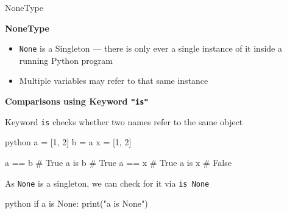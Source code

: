 \documentclass[
	11pt, 
]{beamer}
\begin{document}

\begin{frame}[fragile]{NoneType} %

\textbf{NoneType}
\begin{itemize}
    \item \texttt{None} is a Singleton --- there is only ever a single instance of it inside a running Python program
    \item Multiple variables may refer to that same instance
\end{itemize}

\vspace{.2cm}

\textbf{Comparisons using Keyword \texttt{"is"}}

\vspace{.2cm}

Keyword \texttt{is} checks whether two names refer to the same object

\vspace{.4cm}

\begin{minipage}[t]{0.38\textwidth}
\begin{center}
\begin{mintedbox}{python}
a = [1, 2]
b = a
x = [1, 2]

a == b # True
a is b # True
a == x # True
a is x # False
\end{mintedbox}
\end{center}
\end{minipage}
\hfill
\begin{minipage}[t]{0.55\textwidth}
As \texttt{None} is a singleton, we can check for it via \texttt{is None}

\begin{mintedbox}{python}
if a is None:
    print("a is None")
\end{mintedbox}

\end{minipage}
\end{frame}

\end{document}
